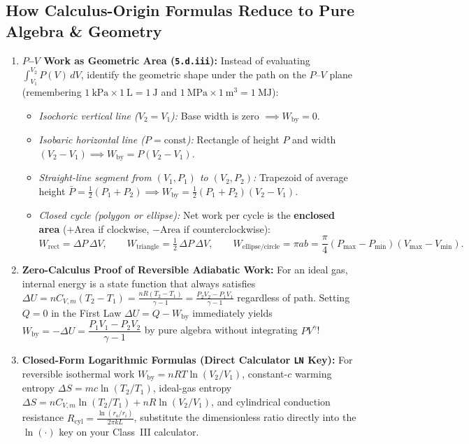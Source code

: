 \subsection{How Calculus-Origin Formulas Reduce to Pure Algebra \& Geometry}
\begin{enumerate}
  \item \textbf{$P$--$V$ Work as Geometric Area (\texttt{5.d.iii}):} Instead of evaluating $\int_{V_1}^{V_2} P(V)\,dV$, identify the geometric shape under the path on the $P$--$V$ plane (remembering $\SI{1}{\kilo\pascal}\times\SI{1}{\liter} = \SI{1}{\joule}$ and $\SI{1}{\mega\pascal}\times\SI{1}{\cubic\meter} = \SI{1}{\mega\joule}$):
    \begin{itemize}
      \item \emph{Isochoric vertical line ($V_2 = V_1$):} Base width is zero $\implies W_{\mathrm{by}} = 0$.
      \item \emph{Isobaric horizontal line ($P = \mathrm{const}$):} Rectangle of height $P$ and width $(V_2 - V_1) \implies W_{\mathrm{by}} = P(V_2 - V_1)$.
      \item \emph{Straight-line segment from $(V_1, P_1)$ to $(V_2, P_2)$:} Trapezoid of average height $\bar{P} = \tfrac{1}{2}(P_1 + P_2) \implies W_{\mathrm{by}} = \tfrac{1}{2}(P_1 + P_2)(V_2 - V_1)$.
      \item \emph{Closed cycle (polygon or ellipse):} Net work per cycle is the \textbf{enclosed area} ($+\mathrm{Area}$ if clockwise, $-\mathrm{Area}$ if counterclockwise):
        \begin{equation}\label{eq:02:cycleareas}
          W_{\mathrm{rect}} = \Delta P\,\Delta V, \qquad W_{\mathrm{triangle}} = \tfrac{1}{2}\,\Delta P\,\Delta V, \qquad W_{\mathrm{ellipse/circle}} = \pi a b = \frac{\pi}{4}(P_{\max} - P_{\min})(V_{\max} - V_{\min}).
        \end{equation}
    \end{itemize}
  \item \textbf{Zero-Calculus Proof of Reversible Adiabatic Work:} For an ideal gas, internal energy is a state function that always satisfies $\Delta U = nC_{V,m}(T_2 - T_1) = \frac{nR(T_2 - T_1)}{\gamma - 1} = \frac{P_2V_2 - P_1V_1}{\gamma - 1}$ regardless of path. Setting $Q = 0$ in the First Law $\Delta U = Q - W_{\mathrm{by}}$ immediately yields $W_{\mathrm{by}} = -\Delta U = \dfrac{P_1V_1 - P_2V_2}{\gamma - 1}$ by pure algebra without integrating $PV^\gamma$!
  \item \textbf{Closed-Form Logarithmic Formulas (Direct Calculator \texttt{LN} Key):} For reversible isothermal work $W_{\mathrm{by}} = nRT\ln(V_2/V_1)$, constant-$c$ warming entropy $\Delta S = mc\ln(T_2/T_1)$, ideal-gas entropy $\Delta S = nC_{V,m}\ln(T_2/T_1) + nR\ln(V_2/V_1)$, and cylindrical conduction resistance $R_{\mathrm{cyl}} = \frac{\ln(r_o/r_i)}{2\pi k L}$, substitute the dimensionless ratio directly into the $\ln(\cdot)$ key on your Class~III calculator.

\end{enumerate}
